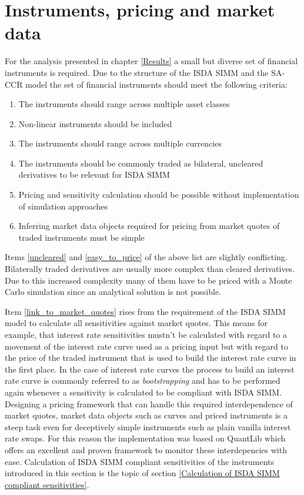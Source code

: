 \documentclass[../Thesis_AHoecherl.tex]{subfiles}
\begin{document}
    \section{Instruments, pricing and market data}\label{Instruments, pricing and market data}
    For the analysis presented in chapter \ref{Results} a small but diverse set of financial instruments is required. Due to the structure of the \gls{ISDA SIMM} and the \gls{SA-CCR} model the set of financial instruments should meet the following criteria:

    \begin{enumerate}
        \item The instruments should range across multiple asset classes
        \item Non-linear instruments should be included
        \item The instruments should range across multiple currencies
        \item The instruments should be commonly traded as bilateral, uncleared derivatives to be relevant for \gls{ISDA SIMM} \label{uncleared}
        \item Pricing and sensitivity calculation should be possible without implementation of simulation approaches \label{easy_to_price}
        \item Inferring market data objects required for pricing from market quotes of traded instruments must be simple \label{link_to_market_quotes}   
    \end{enumerate}
    
    Items \ref{uncleared} and \ref{easy_to_price} of the above list are slightly conflicting. Bilaterally traded derivatives are usually more complex than cleared derivatives. Due to this increased complexity many of them have to be priced with a Monte Carlo simulation since an analytical solution is not possible.

    Item \ref{link_to_market_quotes} rises from the requirement of the \gls{ISDA SIMM} model to calculate all sensitivities against market quotes. This means for example, that interest rate sensitivities mustn't be calculated with regard to a movement of the interest rate curve used as a pricing input but with regard to the price of the traded instrument that is used to build the interest rate curve in the first place. In the case of interest rate curves the process to build an interest rate curve is commonly referred to as \emph{bootstrapping} and has to be performed again whenever a sensitivity is calculated to be compliant with \gls{ISDA SIMM}. Designing a pricing framework that can handle this required interdependence of market quotes, market data objects such as curves and priced instruments is a steep task even for deceptively simple instruments such as plain vanilla interest rate swaps. For this reason the implementation was based on QuantLib which offers an excellent and proven framework to monitor these interdepencies with ease. Calculation of \gls{ISDA SIMM} compliant sensitivities of the instruments introduced in this section is the topic of section \ref{Calculation of ISDA SIMM compliant sensitivities}.
\end{document}
